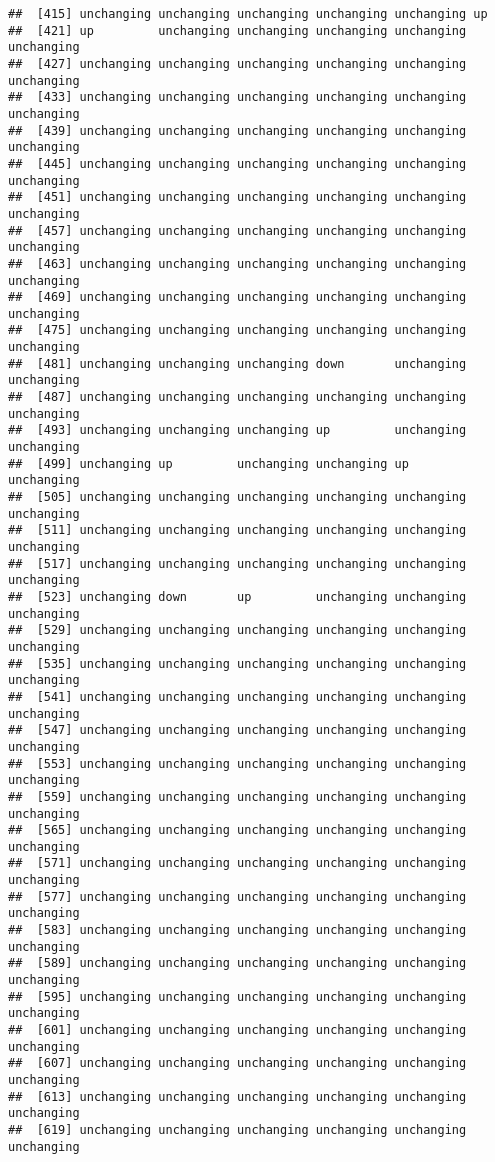 \documentclass[]{article}
\begin{document}
\begin{verbatim}
##  [415] unchanging unchanging unchanging unchanging unchanging up        
##  [421] up         unchanging unchanging unchanging unchanging unchanging
##  [427] unchanging unchanging unchanging unchanging unchanging unchanging
##  [433] unchanging unchanging unchanging unchanging unchanging unchanging
##  [439] unchanging unchanging unchanging unchanging unchanging unchanging
##  [445] unchanging unchanging unchanging unchanging unchanging unchanging
##  [451] unchanging unchanging unchanging unchanging unchanging unchanging
##  [457] unchanging unchanging unchanging unchanging unchanging unchanging
##  [463] unchanging unchanging unchanging unchanging unchanging unchanging
##  [469] unchanging unchanging unchanging unchanging unchanging unchanging
##  [475] unchanging unchanging unchanging unchanging unchanging unchanging
##  [481] unchanging unchanging unchanging down       unchanging unchanging
##  [487] unchanging unchanging unchanging unchanging unchanging unchanging
##  [493] unchanging unchanging unchanging up         unchanging unchanging
##  [499] unchanging up         unchanging unchanging up         unchanging
##  [505] unchanging unchanging unchanging unchanging unchanging unchanging
##  [511] unchanging unchanging unchanging unchanging unchanging unchanging
##  [517] unchanging unchanging unchanging unchanging unchanging unchanging
##  [523] unchanging down       up         unchanging unchanging unchanging
##  [529] unchanging unchanging unchanging unchanging unchanging unchanging
##  [535] unchanging unchanging unchanging unchanging unchanging unchanging
##  [541] unchanging unchanging unchanging unchanging unchanging unchanging
##  [547] unchanging unchanging unchanging unchanging unchanging unchanging
##  [553] unchanging unchanging unchanging unchanging unchanging unchanging
##  [559] unchanging unchanging unchanging unchanging unchanging unchanging
##  [565] unchanging unchanging unchanging unchanging unchanging unchanging
##  [571] unchanging unchanging unchanging unchanging unchanging unchanging
##  [577] unchanging unchanging unchanging unchanging unchanging unchanging
##  [583] unchanging unchanging unchanging unchanging unchanging unchanging
##  [589] unchanging unchanging unchanging unchanging unchanging unchanging
##  [595] unchanging unchanging unchanging unchanging unchanging unchanging
##  [601] unchanging unchanging unchanging unchanging unchanging unchanging
##  [607] unchanging unchanging unchanging unchanging unchanging unchanging
##  [613] unchanging unchanging unchanging unchanging unchanging unchanging
##  [619] unchanging unchanging unchanging unchanging unchanging unchanging

\end{verbatim}
\end{document}

